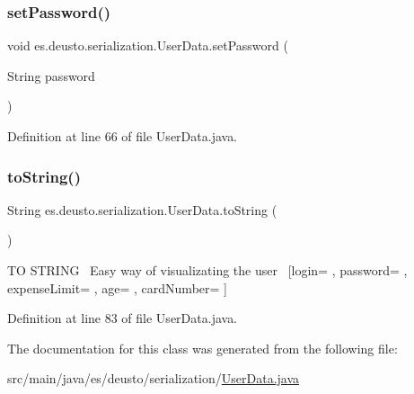 \subsubsection{\texorpdfstring{set\+Password()}{setPassword()}}
{\footnotesize\ttfamily void es.\+deusto.\+serialization.\+User\+Data.\+set\+Password (\begin{DoxyParamCaption}\item[{String}]{password }\end{DoxyParamCaption})}



Definition at line 66 of file User\+Data.\+java.

\mbox{\label{classes_1_1deusto_1_1serialization_1_1_user_data_ac2a905aeaf972596d8fd135d76c763cd}} 
\subsubsection{\texorpdfstring{to\+String()}{toString()}}
{\footnotesize\ttfamily String es.\+deusto.\+serialization.\+User\+Data.\+to\+String (\begin{DoxyParamCaption}{ }\end{DoxyParamCaption})}

TO S\+T\+R\+I\+NG~\newline
Easy way of visualizating the user~\newline
\mbox{[}login= , password= , expense\+Limit= , age= , card\+Number= \mbox{]} 

Definition at line 83 of file User\+Data.\+java.



The documentation for this class was generated from the following file\+:\begin{DoxyCompactItemize}
\item 
src/main/java/es/deusto/serialization/\hyperlink{_user_data_8java}{User\+Data.\+java}\end{DoxyCompactItemize}
